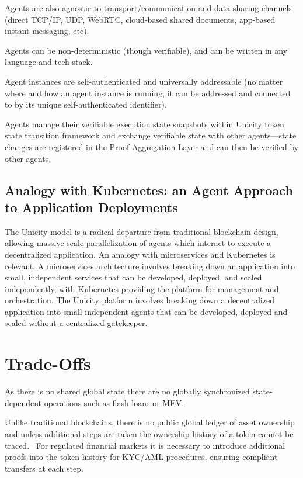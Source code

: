\documentclass{article}
\begin{document}
Agents are also agnostic to transport/communication and data sharing channels (direct TCP/IP, UDP, WebRTC, cloud-based shared documents, app-based instant messaging, etc).

Agents can be non-deterministic (though verifiable), and can be written in any language and tech stack.

Agent instances are self-authenticated and universally addressable (no matter where and how an agent instance is running, it can be addressed and connected to by its unique self-authenticated identifier).

Agents manage their verifiable execution state snapshots within Unicity token state transition framework and exchange verifiable state with other agents---state changes are registered in the Proof Aggregation Layer and can then be verified by other agents.

\subsection{Analogy with Kubernetes: an Agent Approach to Application Deployments}

The Unicity model is a radical departure from traditional blockchain design, allowing massive scale parallelization of agents which interact to execute a decentralized application. An analogy with microservices and Kubernetes is relevant. A microservices architecture involves breaking down an application into small, independent services that can be developed, deployed, and scaled independently, with Kubernetes providing the platform for management and orchestration. The Unicity platform involves breaking down a decentralized application into small independent agents that can be developed, deployed and scaled without a centralized gatekeeper.

\section{Trade-Offs}

As there is no shared global state there are no globally synchronized state-dependent operations such as flash loans or MEV.

Unlike traditional blockchains, there is no public global ledger of asset ownership and unless additional steps are taken the ownership history of a token cannot be traced.  For regulated financial markets it is necessary to introduce additional proofs into the token history for KYC/AML procedures, ensuring compliant transfers at each step.
\end{document}
